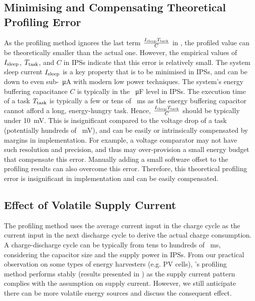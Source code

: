 \subsection{Minimising and Compensating Theoretical Profiling Error}

As the profiling method ignores the last term $\frac{I_{\text{sleep}}T_{\text{task}}}{C}$ in , the profiled value can be theoretically smaller than the actual one.
However, the empirical values of $I_{\text{sleep}}$, $T_{\text{task}}$, and $C$ in IPSs indicate that this error is relatively small. 
The system sleep current $I_{\text{sleep}}$ is a key property that is to be minimised in IPSs, and can be down to even sub-\SI{}{\micro\ampere} with modern low power techniques. 
The system's energy buffering capacitance $C$ is typically in the \SI{}{\micro\farad} level in IPSs. 
The execution time of a task $T_{\text{task}}$ is typically a few or tens of \SI{}{\milli\second} as the energy buffering capacitor cannot afford a long, energy-hungry task. 
Hence, $\frac{I_{\text{sleep}}T_{\text{task}}}{C}$ should be typically under \SI{10}{\milli\volt}. 
This is insignificant compared to the voltage drop of a task (potentially hundreds of \SI{}{\milli\volt}), and can be easily or intrinsically compensated by margins in implementation.
For example, a voltage comparator may not have such resolution and precision, and thus may over-provision a small energy budget that compensate this error. 
Manually adding a small software offset to the profiling results can also overcome this error. 
Therefore, this theoretical profiling error is insignificant in implementation and can be easily compensated. 

    
\subsection{Effect of Volatile Supply Current}

The profiling method uses the average current input in the charge cycle as the current input in the next discharge cycle to derive the actual charge consumption. 
A charge-discharge cycle can be typically from tens to hundreds of \SI{}{\milli\second}, considering the capacitor size and the supply power in IPSs.
From our practical observation on some types of energy harvesters (e.g. PV cells), \nn{}'s profiling method performs stably (results presented in ) as the supply current pattern complies with the assumption on supply current. 
However, we still anticipate there can be more volatile energy sources and discuss the consequent effect. 

